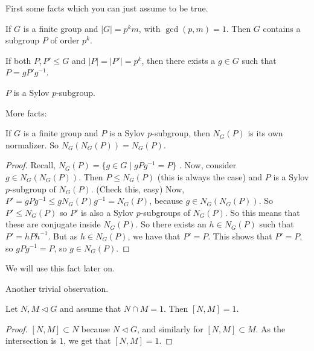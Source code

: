 
First some facts which you can just assume to be true.

If $G$ is a finite group and $|G| = p^{k}m$,
with $\gcd(p, m) = 1$.
Then  $G$ contains a subgroup $P$ of order $p^{k}$.

If both $P, P' \le G$ and $|P| = |P'| = p^{k}$, then there exists a $g \in G$ such that $P = g P' g^{-1}$.

$P$ is a Sylov $p$-subgroup.

More facts:
\begin{lemma}
    If $G$ is a finite group and $P$ is a Sylov $p$-subgroup,
    then $N_G(P)$ is its own normalizer.
So $N_G(N_G(P)) = N_G(P)$.
\end{lemma}

 \begin{proof}
     Recall, $N_G(P) = \{g \in G  \mid  g P g^{-1} =P\} $ .
     Now, consider $g \in N_G(N_G(P))$.
     Then  $P \le  N_G(P)$ (this is always the case) and $P$ is a Sylov $p$-subgroup of $N_G(P)$. (Check this, easy)
     Now, $P' =  g P g^{-1} \le  g N_G(P) g^{-1} = N_G(P)$, because $g \in N_G(N_G(P))$.
     So $P' \le N_G(P)$ so $P'$ is also a Sylov $p$-subgroups of $N_G(P)$.
     So this means that these are conjugate inside  $N_G(P)$. So there exists an  $h  \in N_G(P)$ such that $P' = h P h^{-1}$.
     But as $h \in N_G(P)$, we have that $P' = P$.
     This shows that $P' = P$, so  $g P g^{-1} = P$, so $g \in N_G(P)$.
\end{proof}

We will use this fact later on.

Another trivial observation.
\begin{lemma}
    Let $N, M \triangleleft G$ and assume that $N \cap M = 1$.
    Then $[N, M] = 1$.
\end{lemma}
\begin{proof}
    $[N, M] \subset N$ because $N \triangleleft G$, and similarly for $[N, M] \subset M$.
    As the intersection is $1$, we get that $[N, M] = 1$.
\end{proof}

